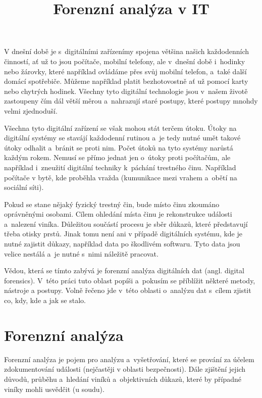 \documentclass[thesis=B,czech]{FITthesis}[2012/06/26]
\title{Forenzní analýza v IT}
\begin{document}

\begin{introduction}
  \label{sec:uvod}

V dnešní době je s~digitálními zařízenímy spojena většina našich každodenních činností, ať už to jsou  počítače, mobilní telefony, ale v~dnešní době i~hodinky nebo žárovky, které například ovládáme přes svůj mobilní telefon, a~také další domácí spotřebiče. Můžeme například platit bezhotovostně ať už pomocí karty nebo chytrých hodinek. Všechny tyto digitální technologie jsou v~našem životě zastoupeny čím dál větší měrou a~nahrazují staré postupy, které postupy mnohdy velmi zjednoduší. 

Všechna tyto digitální zařízení se však mohou stát terčem útoku. Útoky na digitální systémy se stavájí každodenní rutinou a~je tedy nutné umět takové útoky odhalit a~bránit se proti nim. Počet útoků na tyto systémy narůstá každým rokem. Nemusí se přímo jednat jen o~útoky proti počítačům, ale například i~zneužití digitální techniky k~páchání trestného činu. Například počítače v bytě, kde proběhla vražda (kumunikace mezi vrahem a~obětí na sociální síti).

Pokud se stane nějaký fyzický trestný čin, bude místo činu zkoumáno oprávněnými osobami. Cílem ohledání místa činu je rekonstrukce události a~nalezení viníka. Důležitou součástí procesu je sběr důkazů, které představují třeba otisky prstů. Jinak tomu není ani v případě digitálních systému, kde je nutné zajistit důkazy, například data po škodlivém softwaru. Tyto data jsou velice nestálá a~je nutné s~nimi náležitě pracovat.

Vědou, která se tímto zabývá je forenzní analýza digitálních dat (angl. digital forensics). V~této práci tuto oblast popíši a~pokusím se příblížit některé metody, nástroje a postupy. Volně řečeno jde v~této oblasti o~analýzu dat s~cílem zjistit co, kdy, kde a jak se stalo.
 

\end{introduction}

\chapter{Forenzní analýza}
Forenzní analýza je pojem pro analýzu a~vyšetřování, které se prování za účelem zdokumentování události (nejčastěji v oblasti bezpečnosti). Dále zjištění jejich důvodů, průběhu a~hledání viníků a~objektivních důkazů, které by případné viníky mohli usvědčit (u soudu)\cite{for_uvod}.
\end{document}
